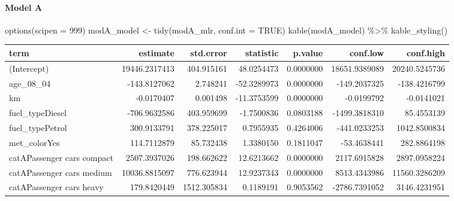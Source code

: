 \documentclass[
]{article}
\newenvironment{Shaded}{\begin{snugshade}}{\end{snugshade}}
\newcommand{\AttributeTok}[1]{\textcolor[rgb]{0.77,0.63,0.00}{#1}}
\newcommand{\ConstantTok}[1]{\textcolor[rgb]{0.00,0.00,0.00}{#1}}
\newcommand{\DecValTok}[1]{\textcolor[rgb]{0.00,0.00,0.81}{#1}}
\newcommand{\FunctionTok}[1]{\textcolor[rgb]{0.00,0.00,0.00}{#1}}
\newcommand{\NormalTok}[1]{#1}
\newcommand{\OtherTok}[1]{\textcolor[rgb]{0.56,0.35,0.01}{#1}}
\newcommand{\SpecialCharTok}[1]{\textcolor[rgb]{0.00,0.00,0.00}{#1}}
\begin{document}
\hypertarget{model-a-12}{%
\paragraph{Model A}\label{model-a-12}}

\begin{Shaded}
\begin{Highlighting}[]
\FunctionTok{options}\NormalTok{(}\AttributeTok{scipen =} \DecValTok{999}\NormalTok{)}
\NormalTok{modA\_model }\OtherTok{\textless{}{-}} \FunctionTok{tidy}\NormalTok{(modA\_mlr, }\AttributeTok{conf.int =} \ConstantTok{TRUE}\NormalTok{)}
\FunctionTok{kable}\NormalTok{(modA\_model) }\SpecialCharTok{\%\textgreater{}\%}
  \FunctionTok{kable\_styling}\NormalTok{()}
\end{Highlighting}
\end{Shaded}

\begin{table}
\centering
\begin{tabular}{l|r|r|r|r|r|r}
\hline
term & estimate & std.error & statistic & p.value & conf.low & conf.high\\
\hline
(Intercept) & 19446.2317413 & 404.915161 & 48.0254473 & 0.0000000 & 18651.9389089 & 20240.5245736\\
\hline
age\_08\_04 & -143.8127062 & 2.748241 & -52.3289973 & 0.0000000 & -149.2037325 & -138.4216799\\
\hline
km & -0.0170407 & 0.001498 & -11.3753599 & 0.0000000 & -0.0199792 & -0.0141021\\
\hline
fuel\_typeDiesel & -706.9632586 & 403.959699 & -1.7500836 & 0.0803188 & -1499.3818310 & 85.4553139\\
\hline
fuel\_typePetrol & 300.9133791 & 378.225017 & 0.7955935 & 0.4264006 & -441.0233253 & 1042.8500834\\
\hline
met\_colorYes & 114.7112879 & 85.732438 & 1.3380150 & 0.1811047 & -53.4638441 & 282.8864198\\
\hline
catAPassenger cars compact & 2507.3937026 & 198.662622 & 12.6213662 & 0.0000000 & 2117.6915828 & 2897.0958224\\
\hline
catAPassenger cars medium & 10036.8815097 & 776.623944 & 12.9237343 & 0.0000000 & 8513.4343986 & 11560.3286209\\
\hline
catAPassenger cars heavy & 179.8420449 & 1512.305834 & 0.1189191 & 0.9053562 & -2786.7391052 & 3146.4231951\\
\hline
\end{tabular}
\end{table}
\end{document}
